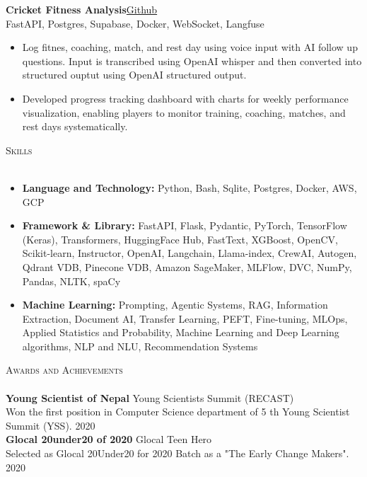 \documentclass[a4paper]{article}
\newcommand{\lineunder} {
    \vspace*{-8pt} \\
    \hspace*{-18pt} \hrulefill \\
}
\newcommand{\header} [1] {
    {\hspace*{-18pt}\vspace*{6pt} \textsc{#1}}
    \vspace*{-6pt} \lineunder
}
\begin{document}
{\textbf{Cricket Fitness Analysis}}\hfill \href{https://github.com/amit-timalsina/sports-analysis}{Github} \\
FastAPI, Postgres, Supabase, Docker, WebSocket, Langfuse
\vspace{-1mm}
\begin{itemize} \itemsep 0pt
    \item Log fitnes, coaching, match, and rest day using voice input with AI follow up questions. Input is transcribed using OpenAI whisper and then converted into structured ouptut using OpenAI structured output.
    \item Developed progress tracking dashboard with charts for weekly performance visualization, enabling players to monitor training, coaching, matches, and rest days systematically.
\end{itemize}
\vspace*{2mm}

\header{Skills}
\vspace{-1mm}
\begin{itemize} \itemsep 0pt
    \item \textbf{Language and Technology:} Python, Bash, Sqlite, Postgres, Docker, AWS, GCP
    \item \textbf{Framework \& Library:} FastAPI, Flask, Pydantic, PyTorch, TensorFlow (Keras), Transformers, HuggingFace Hub, FastText, XGBoost, OpenCV, Scikit-learn, Instructor, OpenAI, Langchain, Llama-index, CrewAI, Autogen, Qdrant VDB, Pinecone VDB, Amazon SageMaker, MLFlow, DVC, NumPy, Pandas, NLTK, spaCy
    \item \textbf{Machine Learning:} Prompting, Agentic Systems, RAG, Information Extraction, Document AI, Transfer Learning, PEFT, Fine-tuning, MLOps, Applied Statistics and Probability, Machine Learning and Deep Learning algorithms, NLP and NLU, Recommendation Systems
\end{itemize}
\vspace{2mm}

\header{Awards and Achievements}
\textbf{Young Scientist of Nepal} \hfill Young Scientists Summit (RECAST)\\
Won the first position in Computer Science department of 5 th Young Scientist Summit (YSS). \hfill 2020\\
\vspace*{2mm}
\textbf{Glocal 20under20 of 2020} \hfill Glocal Teen Hero\\
Selected as Glocal 20Under20 for 2020 Batch as a "The Early Change Makers". \hfill 2020\\
\vspace*{2mm}
\end{document}

